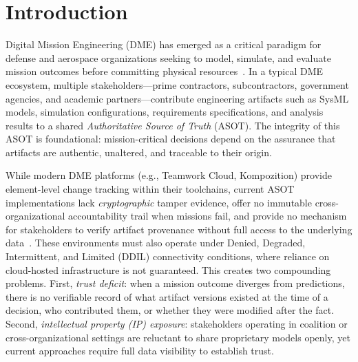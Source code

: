 \section{Introduction}
\label{sec:introduction}

Digital Mission Engineering (DME) has emerged as a critical paradigm for defense and aerospace organizations seeking to model, simulate, and evaluate mission outcomes before committing physical resources~\cite{dod_de_strategy}.
In a typical DME ecosystem, multiple stakeholders---prime contractors, subcontractors, government agencies, and academic partners---contribute engineering artifacts such as SysML models, simulation configurations, requirements specifications, and analysis results to a shared \emph{Authoritative Source of Truth} (ASOT).
The integrity of this ASOT is foundational: mission-critical decisions depend on the assurance that artifacts are authentic, unaltered, and traceable to their origin.

While modern DME platforms (e.g., Teamwork Cloud, Kompozition) provide element-level change tracking within their toolchains, current ASOT implementations lack \emph{cryptographic} tamper evidence, offer no immutable cross-organizational accountability trail when missions fail, and provide no mechanism for stakeholders to verify artifact provenance without full access to the underlying data~\cite{simba_chain}.
These environments must also operate under Denied, Degraded, Intermittent, and Limited (DDIL) connectivity conditions, where reliance on cloud-hosted infrastructure is not guaranteed.
This creates two compounding problems.
First, \emph{trust deficit}: when a mission outcome diverges from predictions, there is no verifiable record of what artifact versions existed at the time of a decision, who contributed them, or whether they were modified after the fact.
Second, \emph{intellectual property (IP) exposure}: stakeholders operating in coalition or cross-organizational settings are reluctant to share proprietary models openly, yet current approaches require full data visibility to establish trust.

